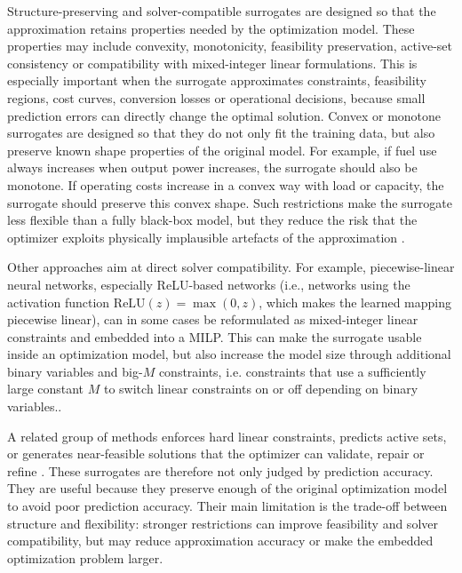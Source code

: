 \documentclass[final,5p,times,twocolumn]{elsarticle}
\begin{document}
Structure-preserving and solver-compatible surrogates are designed so
that the approximation retains properties needed by the optimization
model. These properties may include convexity, monotonicity, feasibility
preservation, active-set consistency or compatibility with mixed-integer
linear formulations. This is especially important when the surrogate
approximates constraints, feasibility regions, cost curves, conversion
losses or operational decisions, because small prediction errors can
directly change the optimal solution. Convex or monotone surrogates are
designed so that they do not only fit the training data, but also
preserve known shape properties of the original model. For example, if
fuel use always increases when output power increases, the surrogate
should also be monotone. If operating costs increase in a convex way
with load or capacity, the surrogate should preserve this convex shape.
Such restrictions make the surrogate less flexible than a fully
black-box model, but they reduce the risk that the optimizer exploits
physically implausible artefacts of the approximation
\cite{Wang2020202933,Hirvonen2017323,Liu20223726,Chen2023657,Chen20244723}.

Other approaches aim at direct solver compatibility. For example,
piecewise-linear neural networks, especially ReLU-based networks (i.e.,
networks using the activation function $\mathrm{ReLU}(z)=\max(0,z)$,
which makes the learned mapping piecewise linear), can in some cases be
reformulated as mixed-integer linear constraints and embedded into a
MILP. This can make the surrogate usable inside an optimization model,
but also increase the model size through additional binary variables and
big-$M$ constraints, i.e. constraints that use a sufficiently large
constant $M$ to switch linear constraints on or off depending on binary
variables.\cite{Wu2022231,Chen2022,Xu20223066,Lin2023}.

A related group of methods enforces hard linear constraints, predicts
active sets, or generates near-feasible solutions that the optimizer can
validate, repair or refine \cite{Chen20244723,Li202359995}. These
surrogates are therefore not only judged by prediction accuracy. They
are useful because they preserve enough of the original optimization
model to avoid poor prediction accuracy. Their main limitation is the
trade-off between structure and flexibility: stronger restrictions can
improve feasibility and solver compatibility, but may reduce
approximation accuracy or make the embedded optimization problem larger.
\end{document}
